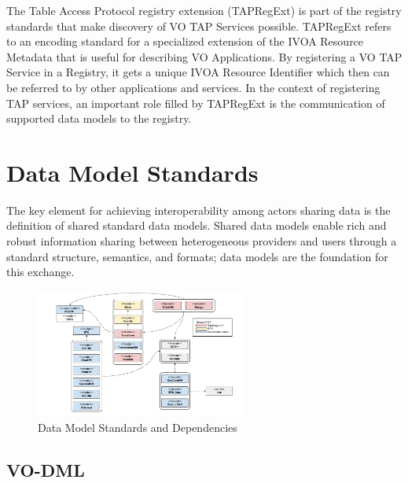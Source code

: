 \documentclass[11pt,letter]{ivoa}
\begin{document}
The Table Access Protocol registry extension (TAPRegExt)
\citep{2012ivoa.spec.0827D} is part of the registry standards that make
discovery of VO TAP Services possible.
TAPRegExt refers to an encoding standard for a specialized extension of
the IVOA Resource Metadata
that is useful for describing VO Applications. By registering a VO TAP
Service in a Registry, it
gets a unique IVOA Resource Identifier which then can be referred to by
other applications and
services. In the context of registering TAP services, an important role
filled by TAPRegExt is
the communication of supported data models to the registry.

\section{Data Model Standards}

The key element for achieving interoperability among actors sharing data
is the definition
of shared standard data models. Shared data models enable rich and
robust information sharing
between heterogeneous providers and users through a standard structure,
semantics, and formats;
data models are the foundation for this exchange.

\begin{figure}[ht]
\centering
\includegraphics[width=0.62\textwidth]{ivoa-arch-dm.pdf}
\caption{Data Model Standards and Dependencies}
\label{fig:dmdeps}
\end{figure}

\subsection{VO-DML}
\end{document}
